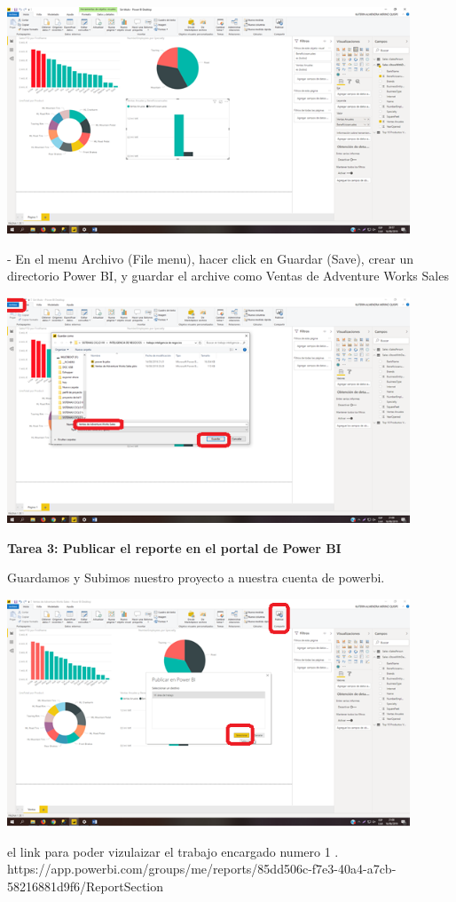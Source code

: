 \begin{center}
\includegraphics[width=12cm]{./Imagenes/image006}
\end{center}

\newpage
 \item{- En el menu Archivo (File menu), hacer click en Guardar (Save), crear un directorio Power BI, y guardar el archive como Ventas de Adventure Works Sales}
\begin{center}
\includegraphics[width=12cm]{./Imagenes/image007}
\end{center}

\textbf{Tarea 3: Publicar el reporte en el portal de Power BI}
\item{Guardamos y Subimos nuestro proyecto a nuestra cuenta de powerbi. }
\begin{center}
\includegraphics[width=12cm]{./Imagenes/image008}
\end{center}

\item{el link para poder vizulaizar el trabajo encargado numero 1 .\\
https://app.powerbi.com/groups/me/reports/85dd506c-f7e3-40a4-a7cb-58216881d9f6/ReportSection }




